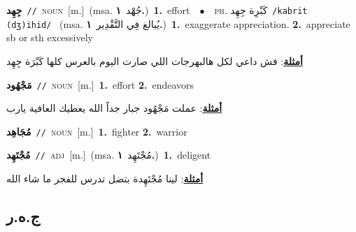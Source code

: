 \documentclass[10pt,a4paper,twoside]{article} %
\begin{document}
\begin{multicols}{2}
{\setlength\topsep{0pt}\textbf{\foreignlanguage{arabic}{جِهِد}}\ {\color{gray}\texttt{//}\color{black}}\ \textsc{noun}\ [m.]\ \color{gray}(msa. \foreignlanguage{arabic}{جُهْد}~\foreignlanguage{arabic}{\textbf{١.}})\color{black}\ \textbf{1.}~effort\ \ $\bullet$\ \ \textsc{ph.} \color{gray} \foreignlanguage{arabic}{كَبْرِة جِهِد}\color{black}\ {\color{gray}\texttt{/{\sffamily kabrit (dʒ)ihid}/}\color{black}}\ \color{gray} (msa. \foreignlanguage{arabic}{يُبالغ فِي التَّقْدِير}~\foreignlanguage{arabic}{\textbf{١.}})\color{black}\ \textbf{1.}~exaggerate appreciation.  \textbf{2.}~appreciate sb or sth excessively\  \begin{flushright}\color{gray}\foreignlanguage{arabic}{\textbf{\underline{\foreignlanguage{arabic}{أمثلة}}}: فش داعي لكل هالبهرجات اللي صارت اليوم بالعرس كلها كَبْرَة جِهِد}\end{flushright}\color{black}} \vspace{2mm}

{\setlength\topsep{0pt}\textbf{\foreignlanguage{arabic}{مَجْهُود}}\ {\color{gray}\texttt{//}\color{black}}\ \textsc{noun}\ [m.]\ \textbf{1.}~effort  \textbf{2.}~endeavors\  \begin{flushright}\color{gray}\foreignlanguage{arabic}{\textbf{\underline{\foreignlanguage{arabic}{أمثلة}}}: عملت مَجْهُود جبار جداً الله يعطيك العافية يارب}\end{flushright}\color{black}} \vspace{2mm}

{\setlength\topsep{0pt}\textbf{\foreignlanguage{arabic}{مُجَاهِد}}\ {\color{gray}\texttt{//}\color{black}}\ \textsc{noun}\ [m.]\ \textbf{1.}~fighter  \textbf{2.}~warrior\ } \vspace{2mm}

{\setlength\topsep{0pt}\textbf{\foreignlanguage{arabic}{مُجْتَهِد}}\ {\color{gray}\texttt{//}\color{black}}\ \textsc{adj}\ [m.]\ \color{gray}(msa. \foreignlanguage{arabic}{مُجْتَهِد}~\foreignlanguage{arabic}{\textbf{١.}})\color{black}\ \textbf{1.}~deligent\  \begin{flushright}\color{gray}\foreignlanguage{arabic}{\textbf{\underline{\foreignlanguage{arabic}{أمثلة}}}: لينا مُجْتَهِدة بتضل تدرس للفجر ما شاء الله}\end{flushright}\color{black}} \vspace{2mm}

\vspace{-3mm}
\subsection*{\color{blue}\foreignlanguage{arabic}{ج.ه.ر}\color{blue}{}} 


\end{multicols}
\end{document}
